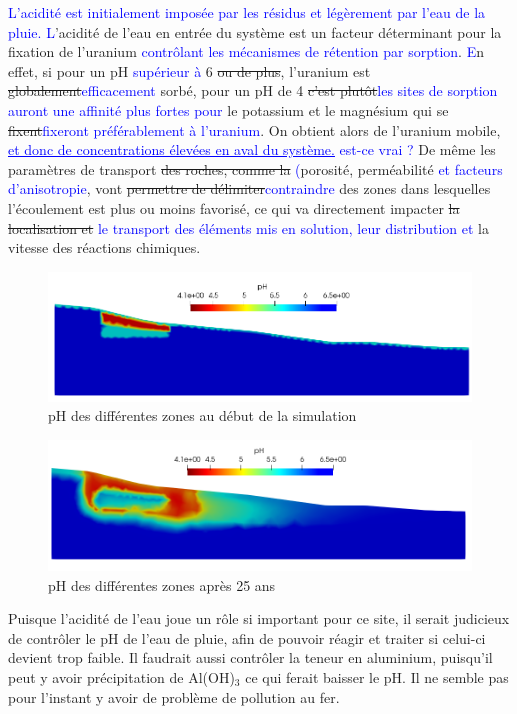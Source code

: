 \documentclass{article}
\newcommand{\blue}[1]{\textcolor{blue}{#1}} %
\begin{document}
\blue{L'acidité est initialement imposée par les résidus et légèrement par l'eau de la pluie.} \blue{L}’acidité de l’eau en entrée du système est un facteur déterminant pour la fixation de l’uranium \blue{contrôlant les mécanismes de rétention par sorption}. \blue{E}n effet, si pour un pH \blue{supérieur à} 6 \sout{ou de plus}, l’uranium est \sout{globalement}\blue{efficacement} sorbé, pour un pH de 4 \sout{c’est plutôt}\blue{les sites de sorption auront une affinité plus fortes pour} le potassium et le magnésium qui se \sout{fixent}\blue{fixeront préférablement à l'uranium}. On obtient alors de l'uranium mobile, \blue{\underline{et donc de concentrations élevées en aval du système.} est-ce vrai ?} De même les paramètres de transport \sout{des roches, comme la }\blue{(}porosité, perméabilité\blue{ et facteurs d'anisotropie}, vont \sout{permettre de délimiter}\blue{contraindre} des zones dans lesquelles l’écoulement est plus ou moins favorisé, ce qui va directement impacter \sout{la localisation et }\blue{le transport des éléments mis en solution, leur distribution et} la vitesse des réactions chimiques.
 
\begin{figure}[H]
    \centering
    \includegraphics[width=\linewidth]{LJ-pH-initial.PNG}
    \caption{pH des différentes zones au début de la simulation}
    \label{fig:pH-initial}
\end{figure}
\begin{figure}[H]
    \centering
    \includegraphics[width=\linewidth]{LJ-pH-final.PNG}
    \caption{pH des différentes zones après 25 ans}
    \label{fig:pH-final}
\end{figure}

Puisque l’acidité de l’eau joue un rôle si important pour ce site, il serait judicieux de contrôler le pH de l’eau de pluie, afin de pouvoir réagir et traiter si celui-ci devient trop faible. Il faudrait aussi contrôler la teneur en aluminium, puisqu’il peut y avoir précipitation de Al(OH)$_3$ ce qui ferait baisser le pH. Il ne semble pas pour l’instant y avoir de problème de pollution au fer.
\end{document}
